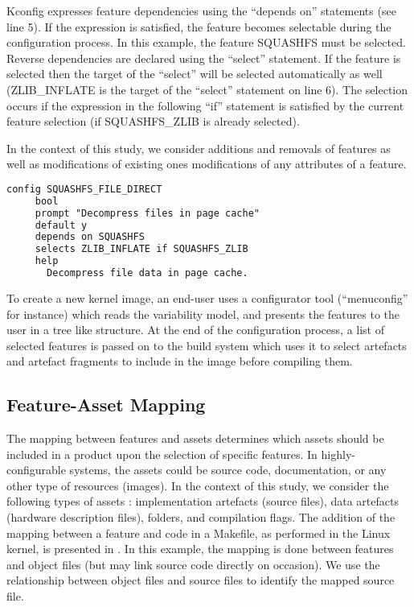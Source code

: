 \begin{sloppypar}
Kconfig expresses feature dependencies using the ``depends on'' statements (see line 5). 
If the expression is satisfied, the feature becomes selectable during the configuration process. In this example, the feature SQUASHFS must be selected.
Reverse dependencies are declared using the ``select'' statement. 
If the feature is selected then the target of the ``select'' will be selected automatically as well (ZLIB\_INFLATE is the target of the ``select'' statement on line 6).
The selection occurs if the expression in the following ``if'' statement is satisfied by the current feature selection (\eg if SQUASHFS\_ZLIB is already selected).

In the context of this study, we consider additions and removals of features as well as modifications of existing ones 
\ie modifications of any attributes of a feature.

\end{sloppypar}
\vspace{-.5ex}
\begin{lstlisting}[caption=A feature declaration in Kconfig,label=listing_kconfig,language=diff]
config SQUASHFS_FILE_DIRECT
	 bool 
	 prompt "Decompress files in page cache"
	 default y
	 depends on SQUASHFS
	 selects ZLIB_INFLATE if SQUASHFS_ZLIB
	 help
	   Decompress file data in page cache.
\end{lstlisting}
\vspace{-.5ex}
To create a new kernel image, an end-user uses a configurator tool (``menuconfig'' for instance)
which reads the variability model, and presents the features to the user in a tree like structure.
At the end of the configuration process, a list of selected features is passed on to the build system 
which uses it to select artefacts and artefact fragments to include in the image before compiling them.

\subsection{Feature-Asset Mapping}
The mapping between features and assets determines which assets should be included in a product upon the selection of specific features.
In highly-configurable systems, the assets could be source code, documentation, or any other type of resources (\eg images).
In the context of this study, we consider the following types of assets : implementation artefacts (\ie source files), data artefacts (\ie hardware description files), folders, and compilation flags.
The addition of the mapping between a feature and code in a Makefile, as performed in the Linux kernel, 
is presented in .
In this example, the mapping is done between features and object files (but may link source code directly on occasion).
We use the relationship between object files and source files to identify the mapped source file.

